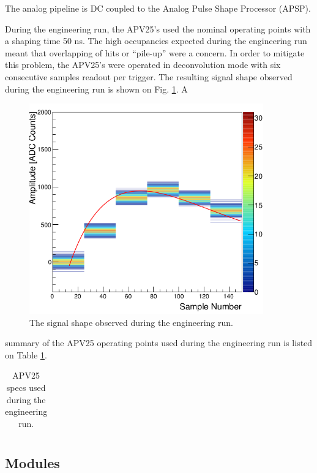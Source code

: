 The analog pipeline is DC coupled to the Analog Pulse Shape Processor (APSP).

During the engineering run, the APV25's used the nominal  operating points with
a shaping time 50 ns.  The high occupancies expected during the engineering run
meant that overlapping of hits or ``pile-up'' were a concern.  In order to 
mitigate this problem, the APV25's were operated in deconvolution mode with
six consecutive samples readout per trigger.  The resulting signal shape 
observed during the engineering run is shown on Fig. \ref{fig:apv_shape}.  A 
\begin{figure}
    \centering
    \includegraphics[width=0.9\textwidth]{images/sideB_response_ch535.png}
    \caption{The signal shape observed during the engineering run.}
    \label{fig:apv_shape}
\end{figure}
summary of the APV25 operating points used during the engineering run is listed
on Table \ref{tab:apv_specs}.
\begin{table}[t]
    \centering
    \begin{tabular}{l|c}
        \hline
        \hline
    \end{tabular}
    \caption{APV25 specs used during the engineering run.}
    \label{tab:apv_specs}
\end{table}

\subsection{Modules}

